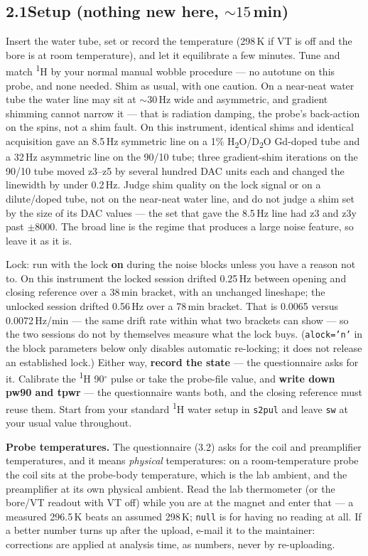 \documentclass[11pt]{article}
\newcommand{\hnmr}{\textsuperscript{1}H}
\newcommand{\dtwo}{D\textsubscript{2}O}
\newcommand{\htwo}{H\textsubscript{2}O}
\begin{document}
\subsection*{2.1\quad Setup (nothing new here, ${\sim}15$\,min)}

Insert the water tube, set or record the temperature (298\,K if VT is
off and the bore is at room temperature), and let it equilibrate a few
minutes. Tune and match \hnmr{} by your normal manual wobble procedure
--- no autotune on this probe, and none needed. Shim as usual, with
one caution. On a near-neat water tube the water line may sit at
${\sim}30$\,Hz wide and asymmetric, and gradient shimming cannot
narrow it --- that is radiation damping, the probe's back-action on
the spins, not a shim fault. On this instrument, identical shims and
identical acquisition gave an 8.5\,Hz symmetric line on a 1\%
\htwo{}/\dtwo{} Gd-doped tube and a 32\,Hz asymmetric line on the
90/10 tube; three gradient-shim iterations on the 90/10 tube moved
z3--z5 by several hundred DAC units each and changed the linewidth by
under 0.2\,Hz. Judge shim quality on the lock signal or on a
dilute/doped tube, not on the near-neat water line, and do not judge a
shim set by the size of its DAC values --- the set that gave the
8.5\,Hz line had z3 and z3y past $\pm$8000. The broad line is the
regime that produces a large noise feature, so leave it as it is.

Lock: run with the lock \textbf{on} during the noise blocks unless you
have a reason not to. On this instrument the locked session drifted
0.25\,Hz between opening and closing reference over a 38\,min bracket,
with an unchanged lineshape; the unlocked session drifted 0.56\,Hz over
a 78\,min bracket. That is 0.0065 versus 0.0072\,Hz/min --- the same
drift rate within what two brackets can show --- so the two sessions do
not by themselves measure what the lock buys. (\texttt{alock='n'} in
the block parameters below only disables automatic re-locking; it does
not release an established lock.) Either way, \textbf{record the state}
--- the questionnaire asks for it. Calibrate the \hnmr{} 90$^{\circ}$
pulse or take the probe-file value, and \textbf{write down pw90 and
tpwr} --- the questionnaire wants both, and the closing reference
must reuse them. Start from your standard \hnmr{} water setup in
\texttt{s2pul} and leave \texttt{sw} at your usual value throughout.

\textbf{Probe temperatures.} The questionnaire (3.2) asks for the coil
and preamplifier temperatures, and it means \emph{physical}
temperatures: on a room-temperature probe the coil sits at the
probe-body temperature, which is the lab ambient, and the preamplifier
at its own physical ambient. Read the lab thermometer (or the bore/VT
readout with VT off) while you are at the magnet and enter that --- a
measured 296.5\,K beats an assumed 298\,K; \texttt{null} is for having
no reading at all. If a better number turns up after the upload, e-mail
it to the maintainer: corrections are applied at analysis time, as
numbers, never by re-uploading.
\end{document}
